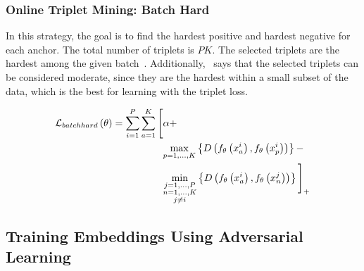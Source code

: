 \subsubsection{Online Triplet Mining: Batch Hard}

In this strategy, the goal is to find the hardest positive and hardest negative for each anchor. The total number of triplets is $PK$. The selected triplets are the hardest among the given batch~\cite{Hermans2017}. Additionally,~\cite{Hermans2017} says that the selected triplets can be considered moderate, since they are the hardest within a small subset of the data, which is the best for learning with the triplet loss.

\begin{equation}
    \begin{aligned}
        {\mathcal{L}_{batchhard}} \left( \theta \right) =
        \sum_{i = 1}^P
        \sum_{a = 1}^K
        \Bigg[
            &\alpha +\\
            &\underset{p = 1, \dots, K} {\max}
            \left\{ {
                {D} \left( 
                    {f_\theta} \left( x_a^i \right),
                    {f_\theta} \left( x_p^i \right)
                 \right)
            } \right\} -\\
            &\underset{\substack{j = 1, \dots, P\\n = 1, \dots, K\\j \neq i}} {\min}
            \left\{ {
                {D} \left( 
                    {f_\theta} \left( x_a^i \right),
                    {f_\theta} \left( x_n^j \right)
                 \right)
            } \right\}
        {\Bigg]}_{+}
    \end{aligned}
\end{equation}

\subsection{Training Embeddings Using Adversarial Learning}
\label{ssec:TrainingEmbeddingsAdversarialLearning}

